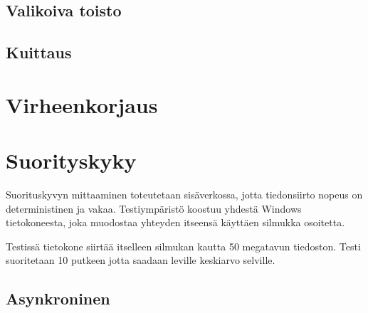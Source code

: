 \documentclass[a4paper,12pt]{article}
\begin{document}
    \subsection{Valikoiva toisto}\label{subsec:valikoiva_toisto}
    \blindtext

    \subsection{Kuittaus}\label{subsec:kuittaus}
    \blindtext


    \section{Virheenkorjaus}\label{sec:virheenkorjaus}
    \blindtext


    \section{Suorityskyky}
    Suorituskyvyn mittaaminen toteutetaan sisäverkossa, jotta tiedonsiirto nopeus on deterministinen ja vakaa.
    Testiympäristö koostuu yhdestä Windows tietokoneesta, joka muodostaa yhteyden itseensä käyttäen silmukka osoitetta.\par
    Testissä tietokone siirtää itselleen silmukan kautta 50 megatavun tiedoston. Testi suoritetaan 10 putkeen jotta saadaan leville keskiarvo selville.

    \subsection{Asynkroninen }
    
    
\end{document}

